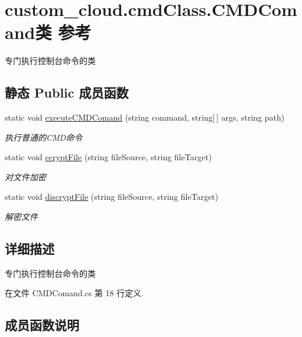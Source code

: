 \hypertarget{classcustom__cloud_1_1cmd_class_1_1_c_m_d_comand}{}\section{custom\+\_\+cloud.\+cmd\+Class.\+C\+M\+D\+Comand类 参考}
\label{classcustom__cloud_1_1cmd_class_1_1_c_m_d_comand}


专门执行控制台命令的类  


\subsection*{静态 Public 成员函数}
\begin{DoxyCompactItemize}
\item 
static void \hyperlink{classcustom__cloud_1_1cmd_class_1_1_c_m_d_comand_a169ec3eaa928aff20c87ee72f217f4fd}{execute\+C\+M\+D\+Comand} (string command, string\mbox{[}$\,$\mbox{]} args, string path)
\begin{DoxyCompactList}\small\item\em 执行普通的\+C\+M\+D命令 \end{DoxyCompactList}\item 
static void \hyperlink{classcustom__cloud_1_1cmd_class_1_1_c_m_d_comand_ace9bf104f8f3f7aa57c06bfc635cb37f}{ecrypt\+File} (string file\+Source, string file\+Target)
\begin{DoxyCompactList}\small\item\em 对文件加密 \end{DoxyCompactList}\item 
static void \hyperlink{classcustom__cloud_1_1cmd_class_1_1_c_m_d_comand_a086edef75f76d41ad506e04071ad9e7b}{discrypt\+File} (string file\+Source, string file\+Target)
\begin{DoxyCompactList}\small\item\em 解密文件 \end{DoxyCompactList}\end{DoxyCompactItemize}


\subsection{详细描述}
专门执行控制台命令的类 



在文件 C\+M\+D\+Comand.\+cs 第 18 行定义.



\subsection{成员函数说明}
\mbox{\label{classcustom__cloud_1_1cmd_class_1_1_c_m_d_comand_a086edef75f76d41ad506e04071ad9e7b}} 
